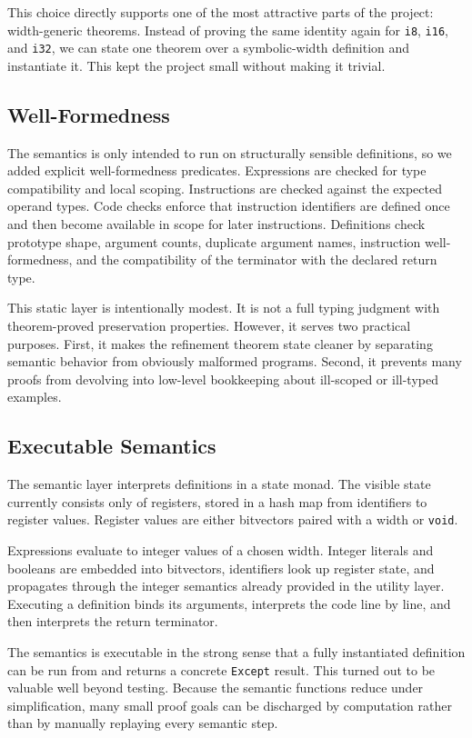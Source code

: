 This choice directly supports one of the most attractive parts of the
project: width-generic theorems. Instead of proving the same identity again
for \texttt{i8}, \texttt{i16}, and \texttt{i32}, we can state one theorem over
a symbolic-width definition and instantiate it. This kept the project small
without making it trivial.

\subsection{Well-Formedness}

The semantics is only intended to run on structurally sensible definitions,
so we added explicit well-formedness predicates. Expressions are checked for
type compatibility and local scoping. Instructions are checked against the
expected operand types. Code checks enforce that instruction identifiers are
defined once and then become available in scope for later instructions.
Definitions check prototype shape, argument counts, duplicate argument names,
instruction well-formedness, and the compatibility of the terminator with the
declared return type.

This static layer is intentionally modest. It is not a full typing judgment
with theorem-proved preservation properties. However, it serves two practical
purposes. First, it makes the refinement theorem state cleaner by separating
semantic behavior from obviously malformed programs. Second, it prevents many
proofs from devolving into low-level bookkeeping about ill-scoped or
ill-typed examples.

\subsection{Executable Semantics}

The semantic layer interprets definitions in a state monad. The visible state
currently consists only of registers, stored in a hash map from identifiers to
register values. Register values are either bitvectors paired with a width or
\texttt{void}.

Expressions evaluate to integer values of a chosen width. Integer literals and
booleans are embedded into bitvectors, identifiers look up register state, and
\poison propagates through the integer semantics already provided in the
utility layer. Executing a definition binds its arguments, interprets the code
line by line, and then interprets the return terminator.

The semantics is executable in the strong sense that a fully instantiated
definition can be run from \lean and returns a concrete \texttt{Except}
result. This turned out to be valuable well beyond testing. Because the
semantic functions reduce under simplification, many small proof goals can be
discharged by computation rather than by manually replaying every semantic
step.

